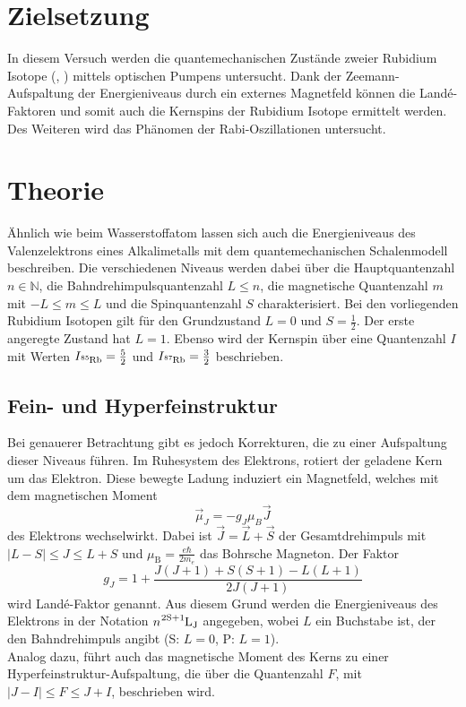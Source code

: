 \section{Zielsetzung}
In diesem Versuch werden die quantemechanischen Zustände zweier Rubidium Isotope (, ) mittels optischen Pumpens untersucht. 
Dank der Zeemann-Aufspaltung der Energieniveaus durch ein externes Magnetfeld können die Landé-Faktoren und 
somit auch die Kernspins der Rubidium Isotope ermittelt werden.
Des Weiteren wird das Phänomen der Rabi-Oszillationen untersucht.

\section{Theorie}
\label{sec:Theorie}
Ähnlich wie beim Wasserstoffatom lassen sich auch die Energieniveaus des Valenzelektrons eines Alkalimetalls mit dem quantemechanischen Schalenmodell beschreiben.
Die verschiedenen Niveaus werden dabei über die Hauptquantenzahl $n \in \mathbb{N}$, die Bahndrehimpulsquantenzahl $L \leq n$, die 
magnetische Quantenzahl $m$ mit $-L \leq m \leq L$ und die Spinquantenzahl $S$ charakterisiert. 
Bei den vorliegenden Rubidium Isotopen gilt für den Grundzustand $L = 0$ und $S = \frac{1}{2}$. Der erste angeregte Zustand hat $L = 1$.
Ebenso wird der Kernspin über eine Quantenzahl $I$ mit Werten $I_{\ce{^{85}Rb}} = \frac{5}{2}$ und $I_{\ce{^{87}Rb}} = \frac{3}{2}$ beschrieben.

\subsection{Fein- und Hyperfeinstruktur}
Bei genauerer Betrachtung gibt es jedoch Korrekturen, die zu einer Aufspaltung dieser Niveaus führen.
Im Ruhesystem des Elektrons, rotiert der geladene Kern um das Elektron. Diese bewegte Ladung induziert ein Magnetfeld, welches mit dem magnetischen Moment 
\begin{equation}
    \label{eqn:mu_J}
    \vec{\mu}_J = -g_J \mu_B \vec{J}
\end{equation}
des Elektrons wechselwirkt. Dabei ist $\vec{J} = \vec{L} + \vec{S}$ der Gesamtdrehimpuls mit $|L-S| \leq J \leq L+S$ und 
$\mu_\text{B} = \frac{e \hbar}{2m_e}$ das Bohrsche Magneton. Der Faktor
\begin{equation}
    \label{eqn:g_J}
    g_J = 1 + \frac{J(J+1)+S(S+1)-L(L+1)}{2J(J+1)}
\end{equation}
wird Landé-Faktor genannt.
Aus diesem Grund werden die Energieniveaus des Elektrons in der Notation $n\ce{^{2S+1}L_J}$ angegeben, wobei $L$ ein Buchstabe ist, der den Bahndrehimpuls 
angibt (S: $L = 0$, P: $L = 1$). \\
Analog dazu, führt auch das magnetische Moment des Kerns zu einer Hyperfeinstruktur-Aufspaltung, die über die Quantenzahl $F$, mit $|J - I| \leq F \leq J + I$,
beschrieben wird.


